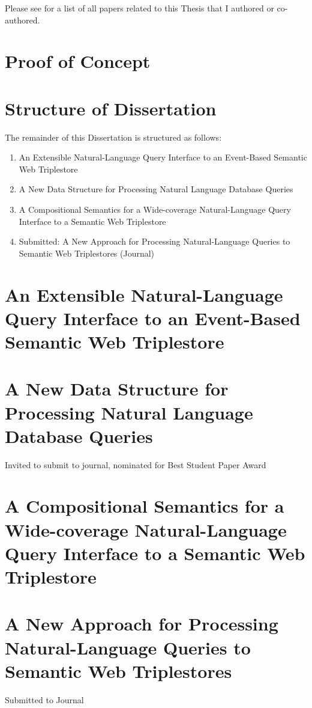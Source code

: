 \documentclass[../main.tex]{subfiles}
\begin{document}
\begin{refsection}
Please see  for a list of all papers related to this Thesis that I authored or co-authored. \cite{peelar2016accommodating}

\section{Proof of Concept} 

\section{Structure of Dissertation}

The remainder of this Dissertation is structured as follows:

\begin{enumerate}
	\item An Extensible Natural-Language Query Interface to an Event-Based Semantic Web Triplestore
	\item A New Data Structure for Processing Natural Language Database Queries 
	\item A Compositional Semantics for a Wide-coverage Natural-Language Query Interface to a Semantic Web Triplestore
	\item Submitted: A New Approach for Processing Natural-Language Queries to Semantic Web Triplestores (Journal)
\end{enumerate}

\section{An Extensible Natural-Language Query Interface to an Event-Based Semantic Web Triplestore}

\section{A New Data Structure for Processing Natural Language Database Queries}

Invited to submit to journal, nominated for Best Student Paper Award

\section{A Compositional Semantics for a Wide-coverage Natural-Language Query Interface to a Semantic Web Triplestore}

\section{A New Approach for Processing Natural-Language Queries to Semantic Web Triplestores}

Submitted to Journal

\printbibliography[heading=subbibintoc]
\end{refsection}
\end{document}
